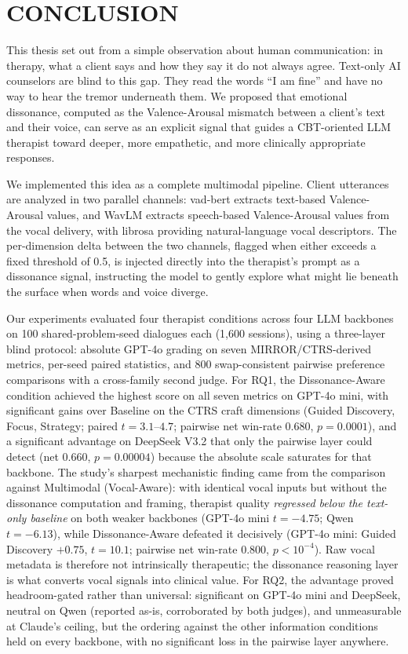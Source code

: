 \setlength{\footskip}{8mm}

\chapter{CONCLUSION}

This thesis set out from a simple observation about human communication: in therapy, what a client says and how they say it do not always agree. Text-only AI counselors are blind to this gap. They read the words ``I am fine'' and have no way to hear the tremor underneath them. We proposed that emotional dissonance, computed as the Valence-Arousal mismatch between a client's text and their voice, can serve as an explicit signal that guides a CBT-oriented LLM therapist toward deeper, more empathetic, and more clinically appropriate responses.

We implemented this idea as a complete multimodal pipeline. Client utterances are analyzed in two parallel channels: vad-bert extracts text-based Valence-Arousal values, and WavLM extracts speech-based Valence-Arousal values from the vocal delivery, with librosa providing natural-language vocal descriptors. The per-dimension delta between the two channels, flagged when either exceeds a fixed threshold of 0.5, is injected directly into the therapist's prompt as a dissonance signal, instructing the model to gently explore what might lie beneath the surface when words and voice diverge.

Our experiments evaluated four therapist conditions across four LLM backbones on 100 shared-problem-seed dialogues each (1,600 sessions), using a three-layer blind protocol: absolute GPT-4o grading on seven MIRROR/CTRS-derived metrics, per-seed paired statistics, and 800 swap-consistent pairwise preference comparisons with a cross-family second judge. For RQ1, the Dissonance-Aware condition achieved the highest score on all seven metrics on GPT-4o mini, with significant gains over Baseline on the CTRS craft dimensions (Guided Discovery, Focus, Strategy; paired $t = 3.1$--$4.7$; pairwise net win-rate $0.680$, $p = 0.0001$), and a significant advantage on DeepSeek V3.2 that only the pairwise layer could detect (net $0.660$, $p = 0.00004$) because the absolute scale saturates for that backbone. The study's sharpest mechanistic finding came from the comparison against Multimodal (Vocal-Aware): with identical vocal inputs but without the dissonance computation and framing, therapist quality \emph{regressed below the text-only baseline} on both weaker backbones (GPT-4o mini $t = -4.75$; Qwen $t = -6.13$), while Dissonance-Aware defeated it decisively (GPT-4o mini: Guided Discovery $+0.75$, $t = 10.1$; pairwise net win-rate $0.800$, $p < 10^{-4}$). Raw vocal metadata is therefore not intrinsically therapeutic; the dissonance reasoning layer is what converts vocal signals into clinical value. For RQ2, the advantage proved headroom-gated rather than universal: significant on GPT-4o mini and DeepSeek, neutral on Qwen (reported as-is, corroborated by both judges), and unmeasurable at Claude's ceiling, but the ordering against the other information conditions held on every backbone, with no significant loss in the pairwise layer anywhere.

